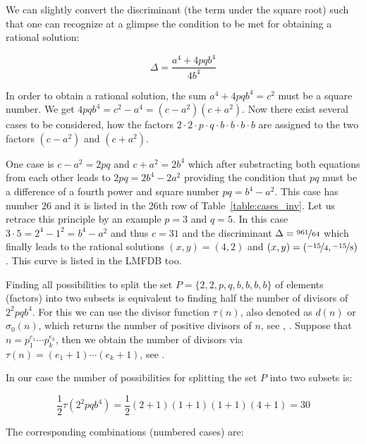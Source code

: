 \documentclass[12pt]{amsart}
\theoremstyle{definition}
\begin{document}
	We can slightly convert the discriminant (the term under the square root) such that one can recognize at a glimpse the condition to be met for obtaining a rational solution:
	
	\begin{equation}
		\label{eq:discriminant}
		\Delta=\frac{a^4+4pqb^4}{4b^4}
	\end{equation}
	
	In order to obtain a rational solution, the sum $a^4+4pqb^4=c^2$ must be a square number. We get $4pqb^4=c^2-a^4=(c-a^2)(c+a^2)$. Now there exist several cases to be considered, how the factors $2\cdot2\cdot p\cdot q\cdot b\cdot b\cdot b\cdot b$ are assigned to the two factors $(c-a^2)$ and $(c+a^2)$.
	
	One case is $c-a^2=2pq$ and $c+a^2=2b^4$ which after substracting both equations from each other leads to $2pq=2b^4-2a^2$ providing the condition that $pq$ must be a difference of a fourth power and square number $pq=b^4-a^2$. This case has number $26$ and it is listed in the 26th row of Table~\ref{table:cases_inv}. Let us retrace this principle by an example $p=3$ and $q=5$. In this case $3\cdot5=2^4-1^2=b^4-a^2$ and thus $c=31$ and the discriminant $\Delta=\nicefrac{961}{64}$ which finally leads to the rational solutions $(x,y)=(4,2)$ and $(x,y)=(\nicefrac{-15}{4},\nicefrac{-15}{8})$. This curve is listed in the LMFDB \cite{LMFDB_14400.cq1} too.
	
	Finding all possibilities to split the set $P=\{2,2,p,q,b,b,b,b\}$ of elements (factors) into two subsets is equivalent to finding half the number of divisors of $2^2pqb^4$. For this we can use the divisor function $\tau(n)$, also denoted as $d(n)$ or $\sigma_0(n)$, which returns the number of positive divisors of $n$, see \cite[p.~123]{Fine_Rosenberger_2007}, \cite{OEIS_A000005}. Suppose that $n=p_1^{e_1}\cdots p_k^{e_k}$, then we obtain the number of divisors via $\tau(n)=(e_1+1)\cdots(e_k+1)$, see \cite[p.~125]{Fine_Rosenberger_2007}.
	
	In our case the number of possibilities for splitting the set $P$ into two subsets is:
	
	\[
	\frac{1}{2}\tau(2^2pqb^4)=\frac{1}{2}(2+1)(1+1)(1+1)(4+1)=30
	\]
	
	\par\medskip
	The corresponding combinations (numbered cases) are:
	
\end{document}
